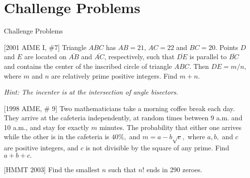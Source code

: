 \documentclass[9pt]{beamer}
\begin{document}
\newpage
\section{Challenge Problems}
\begin{frame}
    \begin{alertblock}{}
        \begin{flushright}
        {\huge Challenge Problems}
        \end{flushright}
    \end{alertblock}
\end{frame}

\begin{frame}[t]{4.1}
\begin{block}{}[2001 AIME I, \#7]
    Triangle $ABC$ has $AB=21$, $AC=22$ and $BC=20$. Points $D$ and $E$ are located on $\overline{AB}$ and $\overline{AC}$, respectively, such that $\overline{DE}$ is parallel to $\overline{BC}$ and contains the center of the inscribed circle of triangle $ABC$. Then $DE=m/n$, where $m$ and $n$ are relatively prime positive integers. Find $m+n$.	

    \textit{Hint: The incenter is at the intersection of angle bisectors.}

\end{block}
\end{frame}

\begin{frame}[t]{4.2}
\begin{block}{}[1998 AIME, \# 9]
    Two mathematicians take a morning coffee break each day. They arrive at the cafeteria independently, at random times between 9 a.m. and 10 a.m., and stay for exactly $m$ minutes. The probability that either one arrives while the other is in the cafeteria is $40 \%,$ and $m = a - b\sqrt {c},$ where $a, b,$ and $c$ are positive integers, and $c$ is not divisible by the square of any prime. Find $a + b + c.$
	
\end{block}
\end{frame}

\begin{frame}[t]{4.3}
\begin{block}{}[HMMT 2003]
    Find the smallest $n$ such that $n!$ ends in 290 zeroes.
	
\end{block}
\end{frame}
\end{document}
